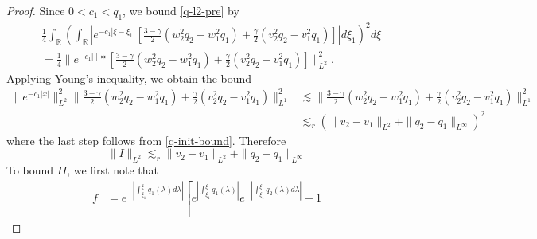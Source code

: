 \documentclass[12pt,reqno]{amsart}
\numberwithin{equation}{section}  %
\numberwithin{figure}{section}
\newcommand{\rr}{\mathbb{R}}
\begin{document}
\begin{proof}
Since $0 < c_{1} < q_{1}$, we bound \eqref{q-l2-pre} by
%
%
\begin{equation*}
\begin{split}
  & \frac{1}{4} \int_{\rr} \left( \int_{\rr} | e^{-c_{1} | \xi - \xi_{1} |} \left[ \frac{3 - \gamma}{2}(w_{2}^{2} q_{2} - w_{1}^{2}q_{1}) + \frac{\gamma}{2}(v_{2}^{2} q_{2} - v_{1}^{2} q_{1}) \right] | d \xi_{1} \right)^{2} d \xi
  \\
  & = \frac{1}{4} \| e^{-c_{1} | \cdot |} * \left[ \frac{3 - \gamma}{2}(w_{2}^{2} q_{2} - w_{1}^{2}q_{1}) + \frac{\gamma}{2}(v_{2}^{2} q_{2} - v_{1}^{2} q_{1}) \right]  \|_{L^{2}}^{2}.
\end{split}
\end{equation*}
%
Applying Young's inequality, we obtain the bound
%
%
\begin{equation*}
\begin{split}
  \| e^{-c_{1} | x |    } \|_{L^{2}}^{2} \|  \frac{3 -
  \gamma}{2}(w_{2}^{2} q_{2} - w_{1}^{2}q_{1}) + \frac{\gamma}{2}(v_{2}^{2} q_{2} -
  v_{1}^{2} q_{1})\|_{L^{1}}^{2}
  & \lesssim \|  \frac{3 -
  \gamma}{2}(w_{2}^{2} q_{2} - w_{1}^{2}q_{1}) + \frac{\gamma}{2}(v_{2}^{2} q_{2} -
  v_{1}^{2} q_{1})\|_{L^{1}}^{2}
  \\
  & \lesssim_{r}
  (\| v_{2} - v_{1} \|_{L^{2}} + \| q_{2} - q_{1} \|_{L^{\infty}})^{2}
\end{split}
\end{equation*}
%
%
where the last step follows from \eqref{q-init-bound}. Therefore
%
%
\begin{equation}
  \label{I-est}
  \| I \|_{L^{2}} \lesssim_{r}
  \| v_{2} - v_{1} \|_{L^{2}} + \| q_{2} - q_{1} \|_{L^{\infty}}
\end{equation}
To bound $II$, we first note that
%
%
\begin{equation*}
\begin{split}
  f & = e^{- | \int_{\xi_{1}}^{\xi} q_{1}(\lambda) d \lambda|} \left[
    e^{| \int_{\xi_{1}}^{\xi} q_{1}(\lambda) |}e^{-|
      \int_{\xi_{1}}^{\xi}q_{2}(\lambda) d \lambda |} - 1

\end{split}
\end{equation*}
\end{proof}
\end{document}
